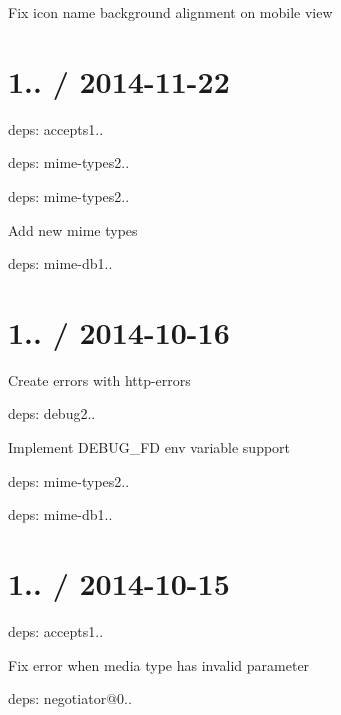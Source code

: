 \begin{DoxyItemize}
\item Fix icon name background alignment on mobile view
\end{DoxyItemize}

\section*{1.. / 2014-\/11-\/22 }


\begin{DoxyItemize}
\item deps\+: accepts1..
\begin{DoxyItemize}
\item deps\+: mime-\/types2..
\end{DoxyItemize}
\item deps\+: mime-\/types2..
\begin{DoxyItemize}
\item Add new mime types
\item deps\+: mime-\/db1..
\end{DoxyItemize}
\end{DoxyItemize}

\section*{1.. / 2014-\/10-\/16 }


\begin{DoxyItemize}
\item Create errors with {\ttfamily http-\/errors}
\item deps\+: debug2..
\begin{DoxyItemize}
\item Implement {\ttfamily D\+E\+B\+U\+G\+\_\+\+FD} env variable support
\end{DoxyItemize}
\item deps\+: mime-\/types2..
\begin{DoxyItemize}
\item deps\+: mime-\/db1..
\end{DoxyItemize}
\end{DoxyItemize}

\section*{1.. / 2014-\/10-\/15 }


\begin{DoxyItemize}
\item deps\+: accepts1..
\begin{DoxyItemize}
\item Fix error when media type has invalid parameter
\item deps\+: negotiator@0..
\end{DoxyItemize}
\end{DoxyItemize}


